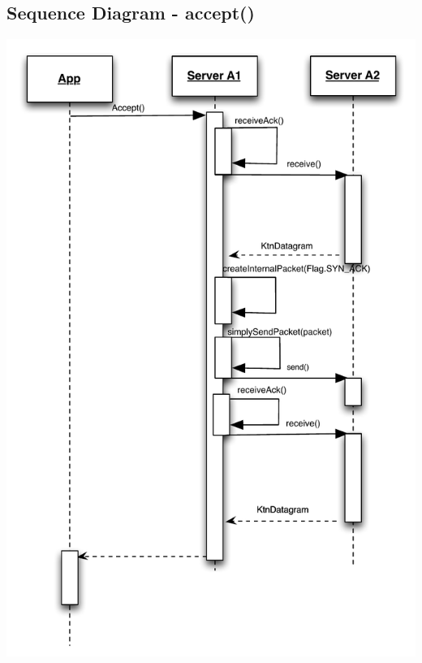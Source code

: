 \documentclass{article}
\begin{document}
\subsection{Sequence Diagram - accept()}
\includegraphics[scale=0.95]{ktnAccept.pdf}
\end{document}
